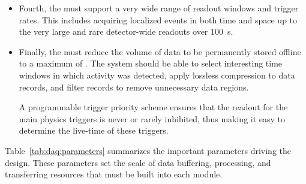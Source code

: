 \begin{itemize}
\item Fourth, the  must support a very wide range of readout windows and trigger rates. This includes acquiring localized events in both time and space up to the very large and rare  detector-wide readouts over \SI{100}{s}.

\item Finally, the  must reduce the volume of data to be permanently stored offline to a maximum of \offsitepbpy.
  The  system should be able to select interesting time windows in which activity was detected, apply lossless compression to data records, and filter records to remove unnecessary data regions.

A programmable trigger priority scheme ensures that the readout for the main physics triggers is never or rarely inhibited, thus making it easy to determine the live-time of these triggers. 


\end{itemize}

Table~\ref{tab:daq:parameters} summarizes the important parameters driving the  design. 
These parameters set the scale of data buffering, processing, and transferring resources that must be built 
into each  module. 

